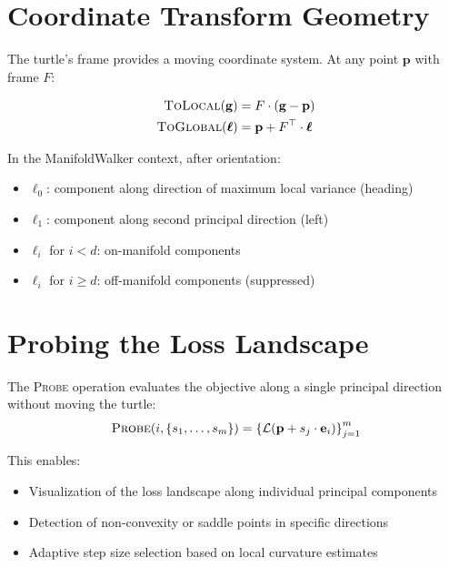 \documentclass[11pt,letterpaper]{article}
\newcommand{\pos}{\mathbf{p}}
\newcommand{\basis}{\mathbf{e}}
\newcommand{\obj}{\mathcal{L}}
\begin{document}
\section{Coordinate Transform Geometry}
\label{sec:transforms}

The turtle's frame provides a moving coordinate system. At any point $\pos$
with frame $F$:

\begin{align}
  \textsc{ToLocal}(\mathbf{g}) &= F \cdot (\mathbf{g} - \pos) \label{eq:tolocal} \\
  \textsc{ToGlobal}(\bm{\ell}) &= \pos + F^\top \cdot \bm{\ell} \label{eq:toglobal}
\end{align}

In the ManifoldWalker context, after orientation:
\begin{itemize}[nosep]
  \item $\ell_0$: component along direction of maximum local variance (heading)
  \item $\ell_1$: component along second principal direction (left)
  \item $\ell_i$ for $i < d$: on-manifold components
  \item $\ell_i$ for $i \geq d$: off-manifold components (suppressed)
\end{itemize}

\section{Probing the Loss Landscape}
\label{sec:probe}

The \textsc{Probe} operation evaluates the objective along a single
principal direction without moving the turtle:
\begin{equation}
  \textsc{Probe}(i, \{s_1, \ldots, s_m\}) = \left\{ \obj(\pos + s_j \cdot \basis_i) \right\}_{j=1}^{m}
\end{equation}

This enables:
\begin{itemize}[nosep]
  \item Visualization of the loss landscape along individual principal components
  \item Detection of non-convexity or saddle points in specific directions
  \item Adaptive step size selection based on local curvature estimates
\end{itemize}
\end{document}
